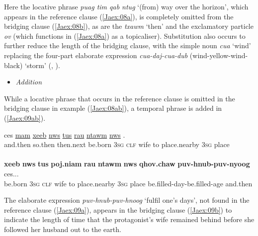 \documentclass[output=paper]{LSP/langsci}
\begin{document}
\noindent
Here the locative phrase \textit{puag tim qab ntug } `(from) way over the horizon', which appears in the reference clause (\ref{Jaex:08a}), is completely omitted from the bridging clause (\ref{Jaex:08b}), as are the   \textit{txawm } `then' and the exclamatory particle \textit{ov} (which functions in (\ref{Jaex:08a}) as a topicaliser). Substitution also occurs to further reduce the length of the bridging clause, with the simple noun \textit{cua} `wind' replacing the four-part elaborate expression \textit{cua-daj-cua-dub }(wind-yellow-wind-black) `storm' (\citealt[][233--237]{jarkey15}, \citealt{johns82,mortensen03}).


\begin{itemize}
\item \textit{Addition}
\end{itemize}

While a locative phrase that occurs in the reference clause is omitted in the bridging clause in example (\ref{Jaex:08ab}), a temporal phrase is added in (\ref{Jaex:09ab}).


\begin{exe}
\ex \label{Jaex:09ab}
\begin{xlist}
\ex \label{Jaex:09a}
\gll ces  \underline{} \underline{mam} \underline{xeeb} \underline{nws} \underline{tus} \underline{} \underline{rau} \underline{ntawm} \underline{nws} \underline{}.\\
and.then so.then  then.next be.born 3\textsc{sg} \textsc{clf} wife to place.nearby 3\textsc{sg} place \\
\glt {}\\
\ex \label{Jaex:09b}
\gll \textbf{xeeb} \textbf{nws} \textbf{tus} \textbf{poj.niam} \textbf{rau} \textbf{ntawm} \textbf{nws} \textbf{qhov.chaw} \textbf{puv-hnub-puv-nyoog}  ces...\\     	      
     be.born 3\textsc{sg} \textsc{clf} wife to place.nearby 3\textsc{sg} place be.filled-day-be.filled-age and.then\\
\glt {} \citep[][3]{johnson92}
\end{xlist}
\end{exe}

\noindent
The elaborate expression \textit{puv-hnub-puv-hnoog} `fulfil one’s days', not found in the reference clause (\ref{Jaex:09a}), appears in the bridging clause (\ref{Jaex:09b}) to indicate the length of time that the protagonist’s wife remained behind before she followed her husband out to the earth.
 
\end{document}
